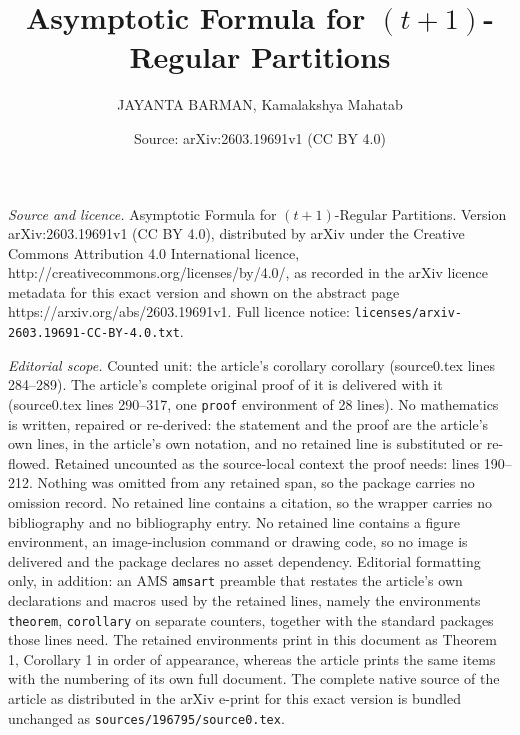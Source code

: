 \documentclass[10pt,a4paper]{amsart}
\title{Asymptotic Formula for $(t+1)$-Regular Partitions}
\author{JAYANTA BARMAN, Kamalakshya Mahatab}
\date{Source: arXiv:2603.19691v1 (CC BY 4.0)}
\begin{document}
\maketitle

\noindent\emph{Source and licence.} Asymptotic Formula for $(t+1)$-Regular Partitions. Version arXiv:2603.19691v1 (CC BY 4.0), distributed by arXiv under the Creative Commons Attribution 4.0 International licence, http://creativecommons.org/licenses/by/4.0/, as recorded in the arXiv licence metadata for this exact version and shown on the abstract page https://arxiv.org/abs/2603.19691v1. Full licence notice: \texttt{licenses/arxiv-2603.19691-CC-BY-4.0.txt}.\par\smallskip

\noindent\textit{Editorial scope.} Counted unit: the article's corollary corollary (source0.tex lines 284--289). The article's complete original proof of it is delivered with it (source0.tex lines 290--317, one \texttt{proof} environment of 28 lines). No mathematics is written, repaired or re-derived: the statement and the proof are the article's own lines, in the article's own notation, and no retained line is substituted or re-flowed.  Retained uncounted as the source-local context the proof needs: lines 190--212.  Nothing was omitted from any retained span, so the package carries no omission record.  No retained line contains a citation, so the wrapper carries no bibliography and no bibliography entry.  No retained line contains a figure environment, an image-inclusion command or drawing code, so no image is delivered and the package declares no asset dependency.  Editorial formatting only, in addition: an AMS \texttt{amsart} preamble that restates the article's own declarations and macros used by the retained lines, namely the environments \texttt{theorem}, \texttt{corollary} on separate counters, together with the standard packages those lines need.  The retained environments print in this document as Theorem 1, Corollary 1 in order of appearance, whereas the article prints the same items with the numbering of its own full document.  The complete native source of the article as distributed in the arXiv e-print for this exact version is bundled unchanged as \texttt{sources/196795/source0.tex}.
\end{document}
